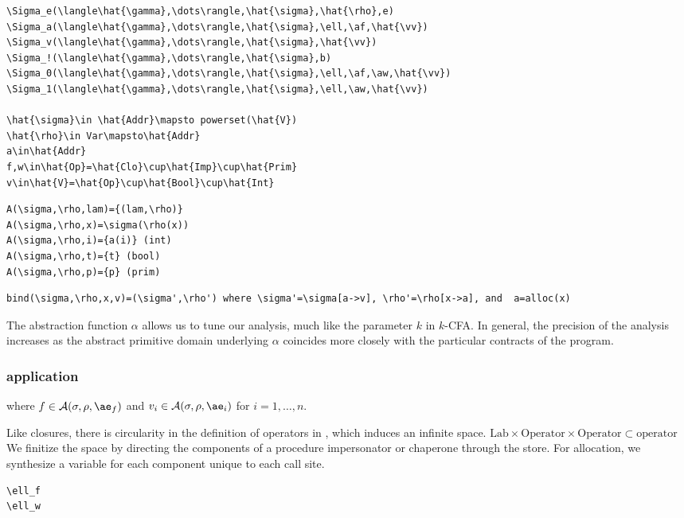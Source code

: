 \begin{verbatim}
\Sigma_e(\langle\hat{\gamma},\dots\rangle,\hat{\sigma},\hat{\rho},e)
\Sigma_a(\langle\hat{\gamma},\dots\rangle,\hat{\sigma},\ell,\af,\hat{\vv})
\Sigma_v(\langle\hat{\gamma},\dots\rangle,\hat{\sigma},\hat{\vv})
\Sigma_!(\langle\hat{\gamma},\dots\rangle,\hat{\sigma},b)
\Sigma_0(\langle\hat{\gamma},\dots\rangle,\hat{\sigma},\ell,\af,\aw,\hat{\vv})
\Sigma_1(\langle\hat{\gamma},\dots\rangle,\hat{\sigma},\ell,\aw,\hat{\vv})

\hat{\sigma}\in \hat{Addr}\mapsto powerset(\hat{V})
\hat{\rho}\in Var\mapsto\hat{Addr}
a\in\hat{Addr}
f,w\in\hat{Op}=\hat{Clo}\cup\hat{Imp}\cup\hat{Prim}
v\in\hat{V}=\hat{Op}\cup\hat{Bool}\cup\hat{Int}
\end{verbatim}

\begin{verbatim}
A(\sigma,\rho,lam)={(lam,\rho)}
A(\sigma,\rho,x)=\sigma(\rho(x))
A(\sigma,\rho,i)={a(i)} (int)
A(\sigma,\rho,t)={t} (bool)
A(\sigma,\rho,p)={p} (prim)
\end{verbatim}

\begin{verbatim}
bind(\sigma,\rho,x,v)=(\sigma',\rho') where \sigma'=\sigma[a->v], \rho'=\rho[x->a], and  a=alloc(x)
\end{verbatim}

The abstraction function $\alpha$ allows us to tune our analysis, much like the parameter $k$ in $k$-CFA.
In general, the precision of the analysis increases as the abstract primitive domain underlying $\alpha$ coincides more closely with the particular contracts of the program.

\subsubsection{application}

\noindent
{}

\noindent
where $f\in\A{\sigma}{\rho}{\ae_f}$ and $v_i\in\A{\sigma}{\rho}{\ae_i}$ for $i=1,\dots,n$.

Like closures, there is circularity in the definition of operators in \chapcalc, which induces an infinite space.
$\mathrm{Lab}\times\mathrm{Operator}\times\mathrm{Operator}\subset\mathrm{operator}$
We finitize the space by directing the components of a procedure impersonator or chaperone through the store.
For allocation, we synthesize a variable for each component unique to each call site.
\begin{verbatim}
\ell_f
\ell_w
\end{verbatim}


